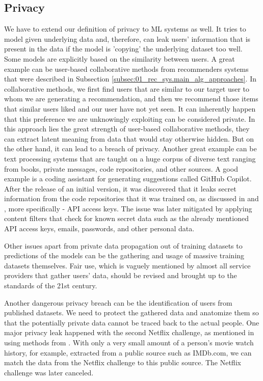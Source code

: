 \subsection*{Privacy}
We have to extend our definition of privacy to ML systems as well. It tries to model given underlying data and, therefore, can leak users' information that is present in the data if the model is 'copying' the underlying dataset too well. Some models are explicitly based on the similarity between users. A great example can be user-based collaborative methods from recommenders systems that were described in Subsection \ref{subsec:01_rec_sys.main_alg_approaches}. In collaborative methods, we first find users that are similar to our target user to whom we are generating a recommendation, and then we recommend those items that similar users liked and our user have not yet seen. It can inherently happen that this preference we are unknowingly exploiting can be considered private. In this approach lies the great strength of user-based collaborative methods, they can extract latent meaning from data that would stay otherwise hidden. But on the other hand, it can lead to a breach of privacy.
Another great example can be text processing systems that are taught on a huge corpus of diverse text ranging from books, private messages, code repositories, and other sources. A good example is a coding assistant for generating suggestions called GitHub Copilot. After the release of an initial version, it was discovered that it leaks secret information from the code repositories that it was trained on, as discussed in \cite{github_copilot_leaks_2} and \cite{github_copilot_leaks}, more specifically - API access keys. The issue was later mitigated by applying content filters that check for known secret data such as the already mentioned API access keys, emails, passwords, and other personal data.

Other issues apart from private data propagation out of training datasets to predictions of the models can be the gathering and usage of massive training datasets themselves. Fair use, which is vaguely mentioned by almost all service providers that gather users' data, should be revised and brought up to the standards of the 21st century.

Another dangerous privacy breach can be the identification of users from published datasets. We need to protect the gathered data and anatomize them so that the potentially private data cannot be traced back to the actual people. One major privacy leak happened with the second Netflix challenge, as mentioned in \cite{netflix_leak_2010} using methods from \cite{netflix_leak_method_2008}. With only a very small amount of a person's movie watch history, for example, extracted from a public source such as IMDb.com, we can match the data from the Netflix challenge to this public source. The Netflix challenge was later canceled.


